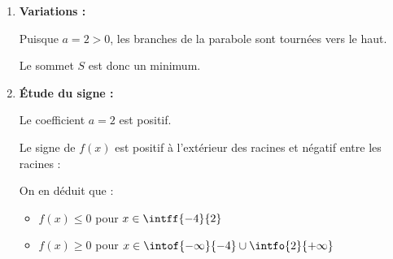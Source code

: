 \begin{methode}
\begin{correction}
\begin{enumerate}
			\item \textbf{Variations :}

			      Puisque $a = 2 > 0$, les branches de la parabole sont tournées vers le haut.

			      Le sommet $S$ est donc un minimum.

			      \begin{center}
			      \end{center}

			\item \textbf{Étude du signe :}

			      Le coefficient $a = 2$ est positif.

			      Le signe de $f(x)$ est positif à l'extérieur des racines et négatif entre les racines :

			      \begin{center}
			      \end{center}

			      On en déduit que :
			      \begin{itemize}
				      \item $f(x) \leqslant 0$ pour $x \in \intff{-4}{2}$
				      \item $f(x) \ge 0$ pour $x \in \intof{-\infty}{-4} \cup \intfo{2}{+\infty}$
			      \end{itemize}

			      \newpage


\end{enumerate}
\end{correction}
\end{methode}
